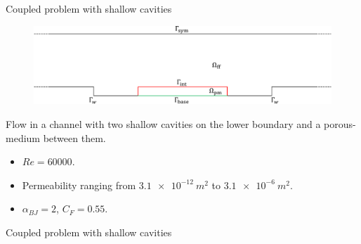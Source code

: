 \documentclass{beamer}
\begin{document}
\begin{frame}{Coupled problem with shallow cavities}
\begin{figure}
	\centering
	\includegraphics[width=\textwidth]{cavities_multidomain.pdf}
\end{figure}
Flow in a channel with two shallow cavities on the lower boundary and a porous-medium 
between them.
\begin{itemize}
	\item $Re=60000$.
	\item Permeability ranging from $\SI{3.1e-12}{m^2}$ to $\SI{3.1e-6}{m^2}$.
	\item $\alpha_{BJ} = 2$, $C_F=0.55$.
\end{itemize}
\end{frame}
\begin{frame}{Coupled problem with shallow cavities}
\begin{figure}
	\centering
	\hspace{-0.5cm}
	
\end{figure}
\end{frame}
\end{document}
